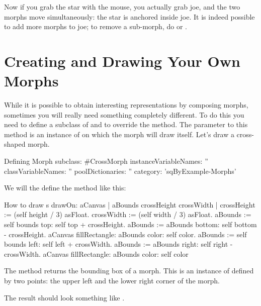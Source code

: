 \documentclass[a4paper,10pt,twoside]{book}
\begin{document}
Now if you grab the star with the mouse, you actually grab joe, and the two morphs move simultaneously: the star is anchored inside joe.
It is indeed possible to add more morphs to joe; to remove a sub-morph, do    or  .


\section{Creating and Drawing Your Own Morphs}

While it is possible to obtain interesting representations by composing morphs, sometimes you will really need something completely different.
To do this you need to define a subclass of  and to override the  method.
The parameter to this method is an instance of  on which the morph will draw itself.
Let's draw a cross-shaped morph.

\begin{classdef}{Defining }
Morph subclass: #CrossMorph
   instanceVariableNames: ''
   classVariableNames: ''
   poolDictionaries: ''
   category: 'sqByExample-Morphs'
\end{classdef}

We will the define the  method like this:
\begin{method}{How to draw s}
drawOn: aCanvas
   | aBounds crossHeight crossWidth |
   crossHeight := (self height / 3) asFloat.
   crossWidth := (self width / 3) asFloat.
   aBounds := self bounds top: self top + crossHeight.
   aBounds := aBounds bottom: self bottom - crossHeight.
   aCanvas fillRectangle: aBounds color: self color.
   aBounds := self bounds left: self left + crossWidth.
   aBounds := aBounds right: self right - crossWidth.
   aCanvas fillRectangle: aBounds color: self color
\end{method}

The  method returns the bounding box of a morph. This is an instance of  defined by two points: the upper left and the lower right corner of the morph.

The result should look something like .
\end{document}
